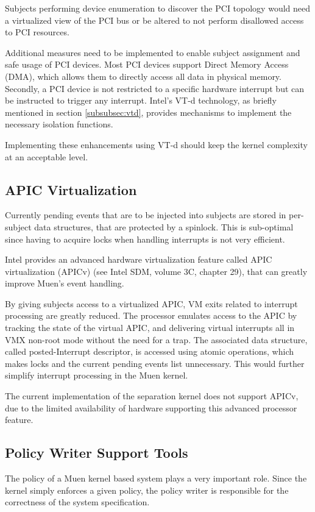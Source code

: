Subjects performing device enumeration to discover the PCI topology would need
a virtualized view of the PCI bus or be altered to not perform disallowed access
to PCI resources.

Additional measures need to be implemented to enable subject assignment and safe
usage of PCI devices. Most PCI devices support Direct Memory Access (DMA), which
allows them to directly access all data in physical memory. Secondly, a PCI
device is not restricted to a specific hardware interrupt but can be instructed
to trigger any interrupt. Intel's VT-d technology, as briefly mentioned in
section \ref{subsubsec:vtd}, provides mechanisms to implement the necessary
isolation functions.

Implementing these enhancements using VT-d should keep the kernel complexity at
an acceptable level.

\subsection{APIC Virtualization}\label{subsec:apicv}
Currently pending events that are to be injected into subjects are stored in
per-subject data structures, that are protected by a spinlock. This is
sub-optimal since having to acquire locks when handling interrupts is not very
efficient.

Intel provides an advanced hardware virtualization feature called APIC
virtualization (APICv) (see Intel SDM, volume 3C, chapter 29), that can greatly
improve Muen's event handling.

By giving subjects access to a virtualized APIC, VM exits related to interrupt
processing are greatly reduced. The processor emulates access to the APIC by
tracking the state of the virtual APIC, and delivering virtual interrupts all in
VMX non-root mode without the need for a trap. The associated data structure,
called posted-Interrupt descriptor, is accessed using atomic operations, which
makes locks and the current pending events list unnecessary. This would further
simplify interrupt processing in the Muen kernel.

The current implementation of the separation kernel does not support APICv, due
to the limited availability of hardware supporting this advanced processor
feature.

\subsection{Policy Writer Support Tools}
The policy of a Muen kernel based system plays a very important role. Since the
kernel simply enforces a given policy, the policy writer is responsible for the
correctness of the system specification.

